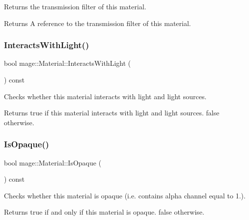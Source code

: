 Returns the transmission filter of this material.

\begin{DoxyReturn}{Returns}
A reference to the transmission filter of this material. 
\end{DoxyReturn}
\hypertarget{structmage_1_1_material_a9bb48fe0f9f8d2c21073bdf650957bd6}{}\label{structmage_1_1_material_a9bb48fe0f9f8d2c21073bdf650957bd6} 
\subsubsection{\texorpdfstring{Interacts\+With\+Light()}{InteractsWithLight()}}
{\footnotesize\ttfamily bool mage\+::\+Material\+::\+Interacts\+With\+Light (\begin{DoxyParamCaption}{ }\end{DoxyParamCaption}) const\hspace{0.3cm}{\ttfamily [noexcept]}}

Checks whether this material interacts with light and light sources.

\begin{DoxyReturn}{Returns}
{\ttfamily true} if this material interacts with light and light sources. {\ttfamily false} otherwise. 
\end{DoxyReturn}
\hypertarget{structmage_1_1_material_a0df1804c29bfd9d2bbc606d6285dccec}{}\label{structmage_1_1_material_a0df1804c29bfd9d2bbc606d6285dccec} 
\subsubsection{\texorpdfstring{Is\+Opaque()}{IsOpaque()}}
{\footnotesize\ttfamily bool mage\+::\+Material\+::\+Is\+Opaque (\begin{DoxyParamCaption}{ }\end{DoxyParamCaption}) const\hspace{0.3cm}{\ttfamily [noexcept]}}

Checks whether this material is opaque (i.\+e. contains alpha channel equal to 1.).

\begin{DoxyReturn}{Returns}
{\ttfamily true} if and only if this material is opaque. {\ttfamily false} otherwise. 
\end{DoxyReturn}
\hypertarget{structmage_1_1_material_a6a62e3889887e77259070e1f9cd9150f}{}\label{structmage_1_1_material_a6a62e3889887e77259070e1f9cd9150f} 
